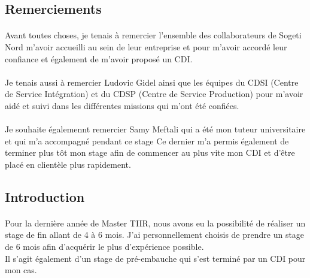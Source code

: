 \documentclass[a4paper,12pt]{report}
\begin{document}
\sffamily




\newpage
\begin{center}
\section*{Remerciements}
\end{center}
\paragraph{}
Avant toutes choses, je tenais à remercier l'ensemble des collaborateurs de Sogeti Nord m'avoir accueilli au sein de leur entreprise et pour m'avoir accordé leur confiance et également de m'avoir proposé un CDI.

\paragraph{}
Je tenais aussi à remercier Ludovic Gidel ainsi que les équipes du CDSI (Centre de Service Intégration) et du CDSP (Centre de Service Production) pour m'avoir aidé et suivi dans les différentes missions qui m'ont été confiées.

\paragraph{}
Je souhaite égalemennt remercier Samy Meftali qui a été mon tuteur universitaire et qui m'a accompagné pendant ce stage Ce dernier m'a permis également de terminer plus tôt mon stage afin de commencer au plus vite mon CDI et d'être placé en clientèle plus rapidement.


\newpage
\begin{center}
\section*{Introduction}
\end{center}
\paragraph{}
Pour la dernière année de Master TIIR, nous avons eu la possibilité de réaliser un stage de fin allant de 4 à 6 mois. J'ai personnellement choisis de prendre un stage de 6 mois afin d'acquérir le plus d'expérience possible.\\
Il s'agit également d'un stage de pré-embauche qui s'est terminé par un CDI pour mon cas.
\end{document}
